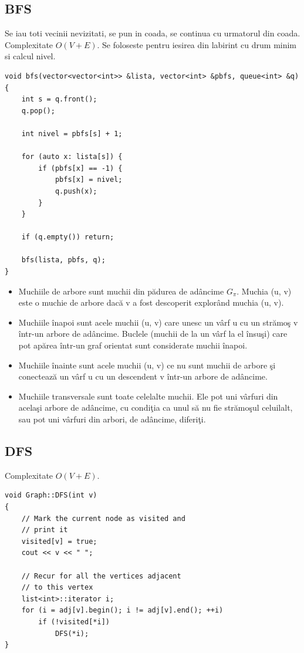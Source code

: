 \documentclass{article}
\begin{document}
\subsection*{BFS} Se iau toti vecinii nevizitati, se pun in coada, se continua cu urmatorul din coada. Complexitate $O(V+E)$. Se foloseste pentru iesirea din labirint cu drum minim si calcul nivel.
\begin{lstlisting}
void bfs(vector<vector<int>> &lista, vector<int> &pbfs, queue<int> &q) {
    int s = q.front();
    q.pop();

    int nivel = pbfs[s] + 1;

    for (auto x: lista[s]) {
        if (pbfs[x] == -1) {
            pbfs[x] = nivel;
            q.push(x);
        }
    }

    if (q.empty()) return;

    bfs(lista, pbfs, q);
}
    \end{lstlisting}

\begin{itemize}
    \item Muchiile de arbore sunt muchii din pădurea de adâncime $G_\pi$. Muchia (u, v) este o muchie de arbore dacă v a fost descoperit explorând muchia (u, v).
    \item Muchiile înapoi sunt acele muchii (u, v) care unesc un vârf u cu un strămoş v într-un arbore de adâncime. Buclele (muchii de la un vârf la el însuşi) care pot apărea într-un graf orientat sunt considerate muchii înapoi.
    \item Muchiile înainte sunt acele muchii (u, v) ce nu sunt muchii de arbore şi conectează un vârf u cu un descendent v într-un arbore de adâncime.
    \item Muchiile transversale sunt toate celelalte muchii. Ele pot uni vârfuri din acelaşi arbore de adâncime, cu condiţia ca unul să nu fie strămoşul celuilalt, sau pot uni vârfuri din arbori, de adâncime, diferiţi.
\end{itemize}

\subsection*{DFS} Complexitate $O(V+E)$.
\begin{lstlisting}
void Graph::DFS(int v)
{
    // Mark the current node as visited and
    // print it
    visited[v] = true;
    cout << v << " ";
 
    // Recur for all the vertices adjacent
    // to this vertex
    list<int>::iterator i;
    for (i = adj[v].begin(); i != adj[v].end(); ++i)
        if (!visited[*i])
            DFS(*i);
}
    \end{lstlisting}
\end{document}
